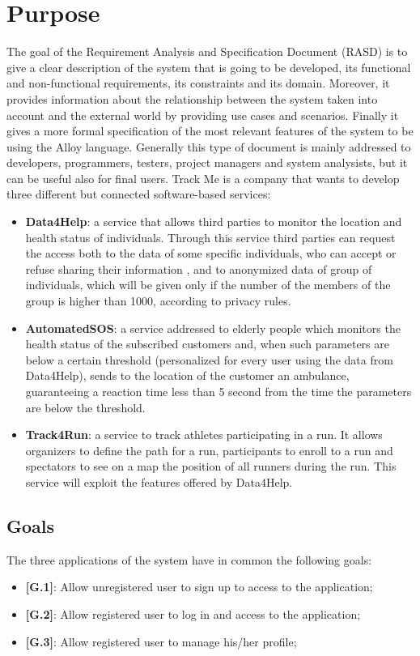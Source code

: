 \section{Purpose}
The  goal of the Requirement Analysis and Specification Document (RASD) is to give a clear description of the system that is going to be developed, its functional and non-functional requirements, its constraints and its domain. Moreover, it provides information about the relationship between the system taken into account and the external world by providing use cases and scenarios. Finally it gives a more formal specification of the most relevant features of the system to be using the Alloy language.
Generally this type of document is mainly addressed to developers, programmers, testers, project managers and system analysists, but it can be useful also for final users.
Track Me is a company that wants to develop three different but connected software-based services:
\begin{itemize}
  \item \textbf{Data4Help}: a service that allows third parties to monitor the location and health status of individuals. Through this service third parties can request the access both to the data of some specific individuals, who can accept or refuse sharing their information , and to anonymized data of group of individuals, which will be given only if the number of the members of the group is higher than 1000, according to privacy rules.
  \item \textbf{AutomatedSOS}: a service addressed to elderly people which monitors the health status of the subscribed customers and, when such parameters are below a certain threshold (personalized for every user using the data from Data4Help), sends to the location of the customer an ambulance, guaranteeing a reaction time less than 5 second from the time the parameters are below the threshold.
  \item \textbf{Track4Run}: a service to track athletes participating in a run. It allows organizers to define the path for a run, participants to enroll to a run and spectators to see on a map the position of all runners during the run. This service will exploit the features offered by Data4Help.
\end{itemize}

\subsection{Goals}
The three applications of the system have in common the following goals:
\begin{itemize}
  \item \textbf{[G.1]}: Allow unregistered user to sign up to access to the application;
  \item \textbf{[G.2]}: Allow registered user to log in and access to the application;
  \item \textbf{[G.3]}: Allow registered user to manage his/her profile;
\end{itemize}

